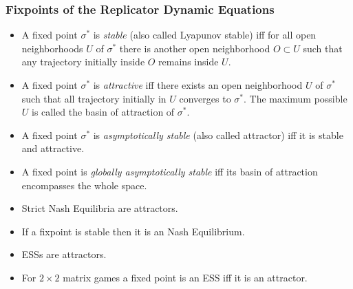 \documentclass[UTF8,11pt,colorlinks,compress,openany]{beamer}%
\begin{document}
\begin{frame}\frametitle{Fixpoints of the Replicator Dynamic Equations}
\begin{itemize}
	\item A fixed point $\sigma^*$ is \emph{stable} (also called Lyapunov stable) iff for all open neighborhoods $U$ of $\sigma^*$ there is another open neighborhood $O\subset U$ such that any trajectory initially inside $O$ remains inside $U$.
	\item A fixed point $\sigma^*$ is \emph{attractive} iff there exists an open neighborhood $U$ of $\sigma^*$ such that all trajectory initially in $U$ converges to $\sigma^*$. The maximum possible $U$ is called the basin of attraction of $\sigma^*$.
	\item A fixed point $\sigma^*$ is \emph{asymptotically stable} (also called attractor) iff it is stable and attractive.
	\item A fixed point is \emph{globally asymptotically stable} iff its basin of attraction encompasses the whole space.
\end{itemize}
\begin{block}{}
\begin{itemize}
	\item Strict Nash Equilibria are attractors.
	\item If a fixpoint is stable then it is an Nash Equilibrium.
	\item ESSs are attractors.
 	\item For $2\times 2$ matrix games a fixed point is an ESS iff it is an attractor.
 \end{itemize}
\end{block}
\end{frame}
\end{document}
